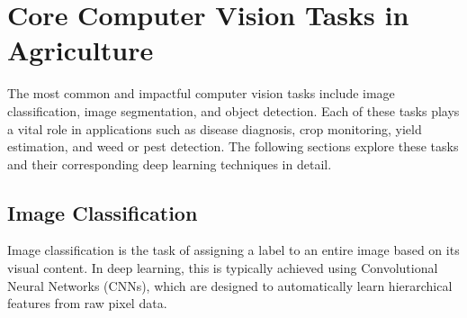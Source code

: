     
    

\section{Core Computer Vision Tasks in Agriculture}

The most common and impactful computer vision tasks include image classification, image segmentation, and object detection. Each of these tasks plays a vital role in applications such as disease diagnosis, crop monitoring, yield estimation, and weed or pest detection. The following sections explore these tasks and their corresponding deep learning techniques in detail.
\subsection{Image Classification}
Image classification is the task of assigning a label to an entire image based on its visual content. In deep learning, this is typically achieved using Convolutional Neural Networks (CNNs), which are designed to automatically learn hierarchical features from raw pixel data. 

